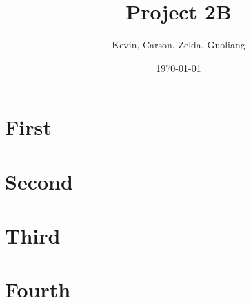 \documentclass[12pt]{report}
\title{Project 2B}
\author{Kevin, Carson, Zelda, Guoliang}
\date{\today}
\begin{document}
    \maketitle

    \section{First}
    
    \section{Second}

    \section{Third}

    \section{Fourth}
\end{document}
